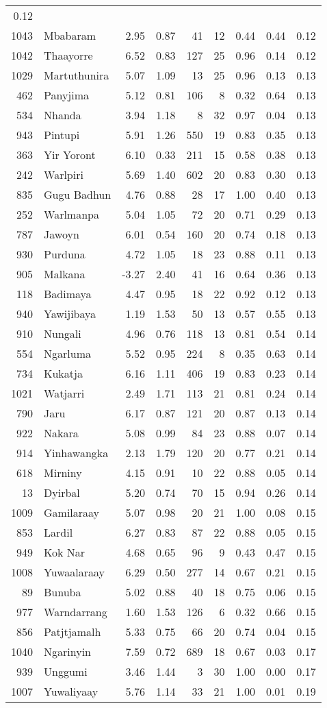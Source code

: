 \begin{longtable}[]{@{}rlrrrrrrr@{}}
0.12\tabularnewline
1043 & Mbabaram & 2.95 & 0.87 & 41 & 12 & 0.44 & 0.44 &
0.12\tabularnewline
1042 & Thaayorre & 6.52 & 0.83 & 127 & 25 & 0.96 & 0.14 &
0.12\tabularnewline
1029 & Martuthunira & 5.07 & 1.09 & 13 & 25 & 0.96 & 0.13 &
0.13\tabularnewline
462 & Panyjima & 5.12 & 0.81 & 106 & 8 & 0.32 & 0.64 &
0.13\tabularnewline
534 & Nhanda & 3.94 & 1.18 & 8 & 32 & 0.97 & 0.04 & 0.13\tabularnewline
943 & Pintupi & 5.91 & 1.26 & 550 & 19 & 0.83 & 0.35 &
0.13\tabularnewline
363 & Yir Yoront & 6.10 & 0.33 & 211 & 15 & 0.58 & 0.38 &
0.13\tabularnewline
242 & Warlpiri & 5.69 & 1.40 & 602 & 20 & 0.83 & 0.30 &
0.13\tabularnewline
835 & Gugu Badhun & 4.76 & 0.88 & 28 & 17 & 1.00 & 0.40 &
0.13\tabularnewline
252 & Warlmanpa & 5.04 & 1.05 & 72 & 20 & 0.71 & 0.29 &
0.13\tabularnewline
787 & Jawoyn & 6.01 & 0.54 & 160 & 20 & 0.74 & 0.18 &
0.13\tabularnewline
930 & Purduna & 4.72 & 1.05 & 18 & 23 & 0.88 & 0.11 &
0.13\tabularnewline
905 & Malkana & -3.27 & 2.40 & 41 & 16 & 0.64 & 0.36 &
0.13\tabularnewline
118 & Badimaya & 4.47 & 0.95 & 18 & 22 & 0.92 & 0.12 &
0.13\tabularnewline
940 & Yawijibaya & 1.19 & 1.53 & 50 & 13 & 0.57 & 0.55 &
0.13\tabularnewline
910 & Nungali & 4.96 & 0.76 & 118 & 13 & 0.81 & 0.54 &
0.14\tabularnewline
554 & Ngarluma & 5.52 & 0.95 & 224 & 8 & 0.35 & 0.63 &
0.14\tabularnewline
734 & Kukatja & 6.16 & 1.11 & 406 & 19 & 0.83 & 0.23 &
0.14\tabularnewline
1021 & Watjarri & 2.49 & 1.71 & 113 & 21 & 0.81 & 0.24 &
0.14\tabularnewline
790 & Jaru & 6.17 & 0.87 & 121 & 20 & 0.87 & 0.13 & 0.14\tabularnewline
922 & Nakara & 5.08 & 0.99 & 84 & 23 & 0.88 & 0.07 & 0.14\tabularnewline
914 & Yinhawangka & 2.13 & 1.79 & 120 & 20 & 0.77 & 0.21 &
0.14\tabularnewline
618 & Mirniny & 4.15 & 0.91 & 10 & 22 & 0.88 & 0.05 &
0.14\tabularnewline
13 & Dyirbal & 5.20 & 0.74 & 70 & 15 & 0.94 & 0.26 & 0.14\tabularnewline
1009 & Gamilaraay & 5.07 & 0.98 & 20 & 21 & 1.00 & 0.08 &
0.15\tabularnewline
853 & Lardil & 6.27 & 0.83 & 87 & 22 & 0.88 & 0.05 & 0.15\tabularnewline
949 & Kok Nar & 4.68 & 0.65 & 96 & 9 & 0.43 & 0.47 & 0.15\tabularnewline
1008 & Yuwaalaraay & 6.29 & 0.50 & 277 & 14 & 0.67 & 0.21 &
0.15\tabularnewline
89 & Bunuba & 5.02 & 0.88 & 40 & 18 & 0.75 & 0.06 & 0.15\tabularnewline
977 & Warndarrang & 1.60 & 1.53 & 126 & 6 & 0.32 & 0.66 &
0.15\tabularnewline
856 & Patjtjamalh & 5.33 & 0.75 & 66 & 20 & 0.74 & 0.04 &
0.15\tabularnewline
1040 & Ngarinyin & 7.59 & 0.72 & 689 & 18 & 0.67 & 0.03 &
0.17\tabularnewline
939 & Unggumi & 3.46 & 1.44 & 3 & 30 & 1.00 & 0.00 & 0.17\tabularnewline
1007 & Yuwaliyaay & 5.76 & 1.14 & 33 & 21 & 1.00 & 0.01 &
0.19\tabularnewline
\bottomrule
\end{longtable}

